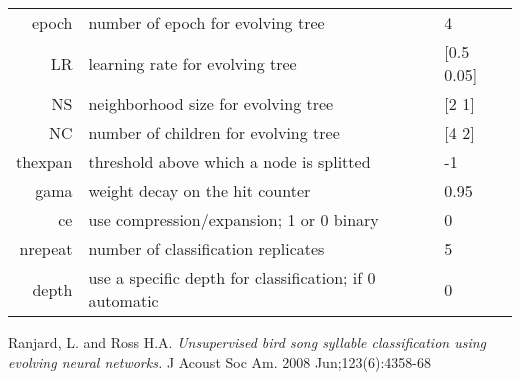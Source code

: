 \documentclass[a4paper]{article}
\begin{document}
\begin{table}[h]
\begin{center}
\begin{tabular}{r|l|l}
epoch          & number of epoch for evolving tree                              & 4 \\
LR             & learning rate for evolving tree                                & [0.5 0.05] \\
NS             & neighborhood size for evolving tree                            & [2 1] \\
NC             & number of children for evolving tree                           &  [4 2] \\
thexpan        & threshold above which a node is splitted                       &  -1 \\
gama           & weight decay on the hit counter                                & 0.95 \\
ce             & use compression/expansion; 1 or 0 binary                       &  0 \\
nrepeat        & number of classification replicates                            &  5 \\
depth          & use a specific depth for classification; if 0 automatic        &  0  \\
\hline
\end{tabular}
\end{center}
\end{table}


\clearpage
\begin{thebibliography}{9}
        Ranjard, L. and Ross H.A.
          \emph{Unsupervised bird song syllable classification using evolving neural networks.}
          J Acoust Soc Am. 2008 Jun;123(6):4358-68
\end{thebibliography}
\end{document}
